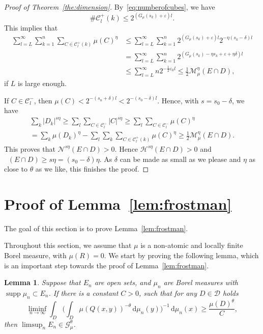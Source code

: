 \documentclass[10pt]{amsart}
\newtheorem{lemm}[theo]{Lemma}\newtheorem{prop}[theo]{Proposition}\newtheorem{coro}[theo]{Corollary}\newtheorem{conj}[theo]{Conjecture}
\theoremstyle{definition}\newtheorem{defi}[theo]{Definition}\newtheorem{rema}[theo]{Remark}\newtheorem{exam}[theo]{Example}\newtheorem{exem}[theo]{Example}\newtheorem{nota}[theo]{Notation}
\DeclareMathOperator{\dimh}{dim_H}
\DeclareMathOperator{\supp}{supp}
\newcommand*{\dd}{\mathrm{d}}
\begin{document}
\begin{proof}[Proof of Theorem~\ref{the:dimension}]
By~\eqref{eq:numberofcubes}, we have
\[
\# \mathscr{C}_l^+ (k) \leq 2^{(G_{\mu} (s_k) + \varepsilon)l}.
\]
This implies that
\begin{align*}
\sum_{l=L}^\infty \sum_{k=1}^n \sum_{C \in \mathscr{C}_l^+ (k)}
\mu (C)^\eta &\leq \sum_{l=L}^\infty \sum_{k=1}^n 2^{(G_{\mu} (s_k) + \varepsilon)l} 2^{-\eta (s_k-\delta) l} \\ & =
\sum_{l=L}^\infty \sum_{k=1}^n 2^{(G_\mu (s_k) - \eta s_k +
\varepsilon + \eta \delta) l} \\ &\leq \sum_{l=L}^\infty n 2^{-\frac{1}{2} \varepsilon_0 l} \leq \frac{1}{2}
\mathscr{M}_\mu^\eta (E \cap D),
\end{align*}
if $L$ is large enough.

If $C \in \mathscr{C}_l^-$, then $\mu (C) < 2^{-(s_n+\delta)l} < 2^{-(s_0-\delta)l}$. Hence, with $s = s_0 - \delta$, we have
\begin{multline*}
\sum_k |D_k|^{s \eta} \geq \sum_l \sum_{C \in \mathscr{C}_l^-} |C|^{s \eta} \geq \sum_l \sum_{C \in \mathscr{C}_l^-} \mu (C)^\eta \\ = \sum_k \mu(D_k)^\eta - \sum_l \sum_k \sum_{C \in
\mathscr{C}_l^+ (k)} \mu (C)^\eta \geq \frac{1}{2}
\mathscr{M}_\mu^\eta (E \cap D).
\end{multline*}
This proves that $\mathscr{N}^{s \eta} (E \cap D) > 0$. Hence $\mathscr{H}^{s \eta} (E \cap D) > 0$ and $\dimh (E \cap D) \geq s
\eta = (s_0 - \delta) \eta$. As $\delta$ can be made as small as we please and $\eta$ as close to $\theta$ as we like, this finishes the proof.
\end{proof}


\section{Proof of Lemma~\ref{lem:frostman}} \label{sec:inhomogeneousproofs}

The goal of this section is to prove Lemma~\ref{lem:frostman}.

Throughout this section, we assume that $\mu$ is a non-atomic and locally finite Borel measure, with $\mu (R) = 0$. We start by proving the following lemma, which is an important step towards the proof of Lemma~\ref{lem:frostman}.

\begin{lemm}\label{lem:frostman2}
Suppose that $E_n$ are open sets, and $\mu_n$ are Borel measures with $\supp \mu_n \subset E_n$. If there is a constant $C > 0$, such that for any $D \in \mathscr{D}$ holds
\begin{equation}\label{eq:energycondition}
\liminf_{n \to \infty} \int_D \biggl(\int_D \mu (Q (x,y))^{-\theta} \, \dd \mu_n (y) \biggr)^{-1} \,
\dd \mu_n (x) \geq \frac{\mu (D)^\theta}{C},
\end{equation}
then $\limsup_n E_n \in \mathscr{G}_\mu^\theta$.
\end{lemm}
\end{document}
